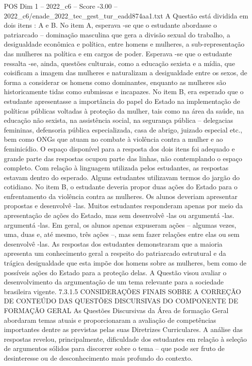 \begin{textsample}{POS Dim 1 – 2022\_c6 – Score -3.00 – 2022\_c6/enade\_2022\_tec\_gest\_tur\_eadd874aa1.txt}
A Questão está dividida em dois itens : A e B.
No item A, esperava -se que o estudante abordasse o patriarcado – dominação masculina que gera a divisão sexual do trabalho, a desigualdade econômica e política, entre homens e mulheres, a sub-representação das mulheres na política e em cargos de poder.
Esperava -se que o estudante ressalta -se, ainda, questões culturais, como a educação sexista e a mídia, que coisificam a imagem das mulheres e naturalizam a desigualdade entre os sexos, de forma a considerar os homens como dominantes, enquanto as mulheres são historicamente tidas como submissas e incapazes.
No item B, era esperado que o estudante apresentasse a importância do papel do Estado na implementação de políticas públicas voltadas à proteção da mulher, tais como na área da saúde, na educação não sexista, na assistência social, na segurança pública – delegacias femininas, defensoria pública especializada, casa de abrigo, juizado especial etc., bem como ONGs que atuam no combate à violência contra a mulher e ao feminicídio.
O espaço disponível para a resposta dos dois itens foi adequado e grande parte das respostas ocupou parte das linhas, não contemplando o espaço completo.
Com relação à linguagem utilizada pelos estudantes, as respostas estavam dentro do esperado.
Alguns estudantes utilizavam termos do jargão do cotidiano.
No item B, o estudante deveria propor duas ações do Estado para o enfrentamento da violência contra as mulheres.
Os alunos deveriam apresentar propostas e desenvolvê -las.
Muitos estudantes responderam apenas por meio da apresentação de ações do Estado, mas sem desenvolvê -las ou argumentá -las. argumentá -las.
Em geral, os alunos apenas expuseram ações – algumas vezes, uma, duas e, até mesmo, três ações –, mas sem fazer relações entre elas ou sem desenvolvê -las.
As respostas dos estudantes demonstraram que a maioria apresenta um conhecimento geral a respeito do patriarcado estrutural e da trágica desigualdade que esta impõe dos homens sobre as mulheres, bem como de possíveis ações do Estado para a proteção delas.
A Questão visou avaliar o desenvolvimento da argumentação de um tema relevante para a sociedade brasileira vigente. 7.3.1.5 CONSIDERAÇÕES FINAIS SOBRE A CORREÇÃO DE CONTEÚDO DAS QUESTÕES DISCURSIVAS DO COMPONENTE DE FORMAÇÃO GERAL As Questões Discursivas da Área de formação Geral abordaram temas atuais e proporcionaram a avaliação de competências importantes dentre as previstas pelas suas Diretrizes Curriculares.
A análise das respostas revelou, principalmente, dificuldade dos estudantes em relação à seleção de argumentos sólidos para discorrer sobre o tema – que pode ser fruto de desinteresse ou de desconhecimento mais profundo do contexto.

\end{textsample}
